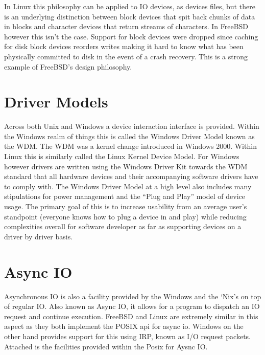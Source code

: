 \documentclass[letterpaper,10pt,draftclsnofoot,onecolumn]{IEEEtran}
\begin{document}
In Linux this philosophy can be applied to IO devices, as devices files, but there is an underlying distinction between block devices that spit back chunks of data in blocks and character devices that return streams of characters. In FreeBSD however this isn’t the case. \cite{freebsdarch} Support for block devices were dropped since caching for disk block devices reorders writes making it hard to know what has been physically committed to disk in the event of a crash recovery. This is a strong example of FreeBSD’s design philosophy.\\
\newpage
\section{Driver Models}
Across both Unix and Windows a device interaction interface is provided. Within the Windows realm of things this is called the Windows Driver Model known as the WDM. The WDM was a kernel change introduced in Windows 2000. Within Linux this is similarly called the Linux Kernel Device Model. For Windows however drivers are written using the Windows Driver Kit towards the WDM standard that all hardware devices and their accompanying software drivers have to comply with. The Windows Driver Model at a high level also includes many stipulations for power management and the “Plug and Play” model of device usage. \cite{russinovich} The primary goal of this is to increase usability from an average user’s standpoint (everyone knows how to plug a device in and play) while reducing complexities overall for software developer as far as supporting devices on a driver by driver basis.\\

\section{Async IO}
Asynchronous IO is also a facility provided by the Windows and the ‘Nix’s on top of regular IO. Also known as Async IO, it allows for a program to dispatch an IO request and continue execution. FreeBSD and Linux are extremely similar in this aspect as they both implement the POSIX api for async io. Windows on the other hand provides support for this using IRP, known as I/O request packets. Attached is the facilities provided within the Posix for Aysnc IO.\\


\end{document}

